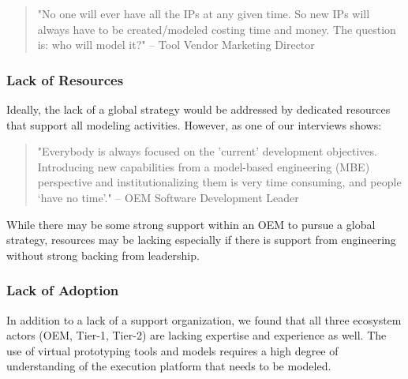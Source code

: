 \begin{quote}
"No one will ever have all the IPs at any given time. So new IPs will always have to be created/modeled costing time and money. The question is: who will model it?"
-- Tool Vendor Marketing Director
\end{quote}

\subsubsection*{Lack of Resources}
Ideally, the lack of a global strategy would be addressed by dedicated resources that support all modeling activities.
However, as one of our interviews shows:

\begin{quote}
"Everybody is always focused on the 'current' development objectives. Introducing new capabilities from a model-based engineering (MBE) perspective and institutionalizing them is very time consuming, and people ‘have no time’." 
-- OEM Software Development Leader
\end{quote}

While there may be some strong support within an OEM to pursue a global strategy, resources may be lacking especially if there is support from engineering without strong backing from leadership.

\subsubsection*{Lack of Adoption}
In addition to a lack of a support organization,
we found that all three ecosystem actors (OEM, Tier-1, Tier-2) are lacking expertise and experience as well.
The use of virtual prototyping tools and models requires a high degree of understanding of the execution platform that needs to be modeled.

